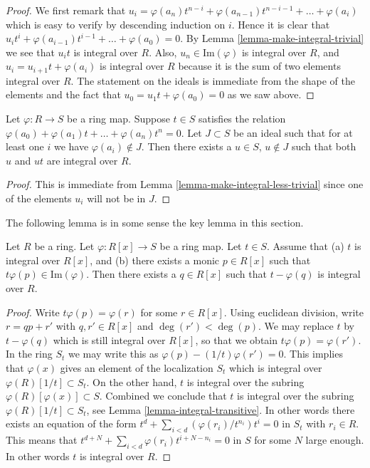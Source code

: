 \begin{proof}
We first remark that $u_{i} = 
\varphi(a_n)t^{n-i} + \varphi(a_{n-1})t^{n-i-1} + \ldots + \varphi(a_{i})$
which is easy to verify by descending induction on $i$. Hence it
is clear that $u_{i}t^{i} + \varphi(a_{i-1})t^{i-1} +
\ldots + \varphi(a_0) = 0$.  
By Lemma \ref{lemma-make-integral-trivial}
we see that $u_it$ is integral over $R$. 
Also, $u_n \in \text{Im}(\varphi)$ is integral over
$R$, and $u_i = u_{i+1}t + \varphi(a_i)$ is integral over $R$
because it is the sum of two elements integral over $R$.
The statement on the ideals is immediate from the
shape of the elements and the fact that
$u_0 = u_1t + \varphi(a_0) = 0$ as we saw above.
\end{proof}

\begin{lemma}
\label{lemma-make-integral-not-in-ideal}
Let $\varphi : R \to S$ be a ring map.
Suppose $t \in S$ satisfies the
relation $\varphi(a_0) + \varphi(a_1)t + \ldots + \varphi(a_n) t^n = 0$.
Let $J \subset S$ be an ideal such that for at
least one $i$ we have $\varphi(a_i) \not \in J$.
Then there exists a $u \in S$, $u \not\in J$ such
that both $u$ and $ut$ are integral over $R$.
\end{lemma}

\begin{proof}
This is immediate from Lemma \ref{lemma-make-integral-less-trivial}
since one of the elements $u_i$ will not be in $J$.
\end{proof}

\noindent
The following lemma is in some sense the key lemma in this
section.

\begin{lemma}
\label{lemma-make-integral-trick}
Let $R$ be a ring. Let $\varphi : R[x] \to S$ be
a ring map. Let $t \in S$.
Assume that (a) $t$ is integral over $R[x]$,
and (b) there exists a monic $p \in R[x]$ such that
$t \varphi(p) \in \text{Im}(\varphi)$. Then there
exists a $q \in R[x]$ such that $t - \varphi(q)$
is integral over $R$.
\end{lemma}

\begin{proof}
Write $t \varphi(p) = \varphi(r)$ for some $r \in R[x]$.
Using euclidean division, write $r = qp + r'$ with
$q,r' \in R[x]$ and $\deg(r') < \deg(p)$. We may replace
$t$ by $t - \varphi(q)$ which is still integral over
$R[x]$, so that we obtain $t \varphi(p) = \varphi(r')$.
In the ring $S_t$ we may write this as
$\varphi(p) - (1/t) \varphi(r') = 0$.
This implies that $\varphi(x)$ gives an element of the
localization $S_t$ which is integral over
$\varphi(R)[1/t] \subset S_t$. On the other hand,
$t$ is integral over the subring $\varphi(R)[\varphi(x)] \subset S$.
Combined we conclude that $t$ is integral over
the subring $\varphi(R)[1/t] \subset S_t$, see Lemma
\ref{lemma-integral-transitive}. In other words
there exists an equation of the form
$t^d + \sum_{i<d} (\varphi(r_i)/t^{n_i}) t^i = 0$
in $S_t$ with $r_i \in R$. This means that
$t^{d+N} + \sum_{i < d} \varphi(r_i) t^{i + N - n_i} = 0$ in $S$
for some $N$ large enough. In other words
$t$ is integral over $R$.
\end{proof}

